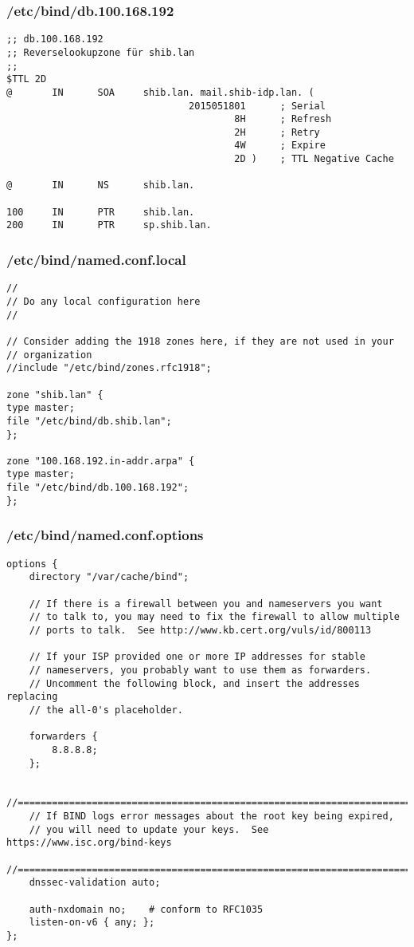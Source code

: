 \subsubsection{/etc/bind/db.100.168.192}
\begin{lstlisting}
;; db.100.168.192
;; Reverselookupzone für shib.lan
;;
$TTL 2D
@       IN      SOA     shib.lan. mail.shib-idp.lan. (
                                2015051801      ; Serial
                                        8H      ; Refresh
                                        2H      ; Retry
                                        4W      ; Expire
                                        2D )    ; TTL Negative Cache

@       IN      NS      shib.lan.

100     IN      PTR     shib.lan.
200     IN      PTR     sp.shib.lan.

\end{lstlisting}

\subsubsection{/etc/bind/named.conf.local}
\begin{lstlisting}
//
// Do any local configuration here
//

// Consider adding the 1918 zones here, if they are not used in your
// organization
//include "/etc/bind/zones.rfc1918";

zone "shib.lan" {
type master;
file "/etc/bind/db.shib.lan";
};

zone "100.168.192.in-addr.arpa" {
type master;
file "/etc/bind/db.100.168.192";
};
\end{lstlisting}

\subsubsection{/etc/bind/named.conf.options}
\begin{lstlisting}
options {
	directory "/var/cache/bind";

	// If there is a firewall between you and nameservers you want
	// to talk to, you may need to fix the firewall to allow multiple
	// ports to talk.  See http://www.kb.cert.org/vuls/id/800113

	// If your ISP provided one or more IP addresses for stable 
	// nameservers, you probably want to use them as forwarders.  
	// Uncomment the following block, and insert the addresses replacing 
	// the all-0's placeholder.

	forwarders {
	 	8.8.8.8;
	};

	//========================================================================
	// If BIND logs error messages about the root key being expired,
	// you will need to update your keys.  See https://www.isc.org/bind-keys
	//========================================================================
	dnssec-validation auto;

	auth-nxdomain no;    # conform to RFC1035
	listen-on-v6 { any; };
};
\end{lstlisting}

